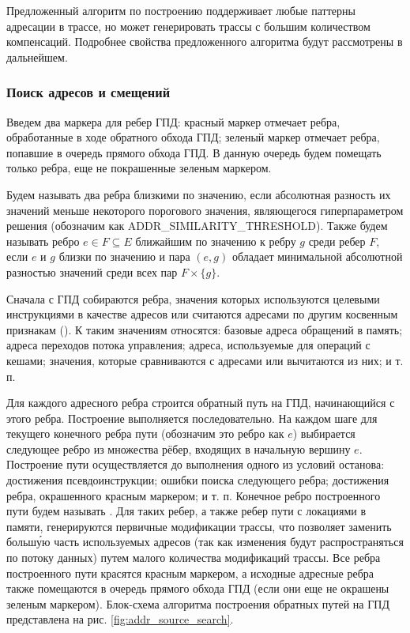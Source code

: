 Предложенный алгоритм по построению поддерживает любые паттерны адресации в трассе, но может генерировать трассы с большим количеством компенсаций. Подробнее свойства предложенного алгоритма будут рассмотрены в дальнейшем.

\subsubsection{Поиск адресов и смещений}

Введем два маркера для ребер ГПД: красный маркер отмечает ребра, обработанные в ходе обратного обхода ГПД; зеленый маркер отмечает ребра, попавшие в очередь прямого обхода ГПД. В данную очередь будем помещать только ребра, еще не покрашенные зеленым маркером.

Будем называть два ребра близкими по значению, если абсолютная разность их значений меньше некоторого порогового значения, являющегося гиперпараметром решения (обозначим как ADDR\_SIMILARITY\_THRESHOLD). Также будем называть ребро $e \in F \subseteq E$ ближайшим по значению к ребру $g$ среди ребер $F$, если $e$ и $g$ близки по значению и пара $(e, g)$ обладает минимальной абсолютной разностью значений среди всех пар $F \times \{g\}$.

Сначала с ГПД собираются ребра, значения которых используются целевыми инструкциями в качестве адресов или считаются адресами по другим косвенным признакам (). К таким значениям относятся: базовые адреса обращений в память; адреса переходов потока управления; адреса, используемые для операций с кешами; значения, которые сравниваются с адресами или вычитаются из них; и т. п.

Для каждого адресного ребра строится обратный путь на ГПД, начинающийся с этого ребра. Построение выполняется последовательно. На каждом шаге для текущего конечного ребра пути (обозначим это ребро как $e$) выбирается следующее ребро из множества рёбер, входящих в начальную вершину $e$. Построение пути осуществляется до выполнения одного из условий останова: достижения псевдоинструкции; ошибки поиска следующего ребра; достижения ребра, окрашенного красным маркером; и т. п. Конечное ребро построенного пути будем называть . Для таких ребер, а также ребер пути с локациями в памяти, генерируются первичные модификации трассы, что позволяет заменить больш\'{у}ю часть используемых адресов (так как изменения будут распространяться по потоку данных) путем малого количества модификаций трассы. Все ребра построенного пути красятся красным маркером, а исходные адресные ребра также помещаются в очередь прямого обхода ГПД (если они еще не окрашены зеленым маркером). Блок-схема алгоритма построения обратных путей на ГПД представлена на рис. \ref{fig:addr_source_search}.

